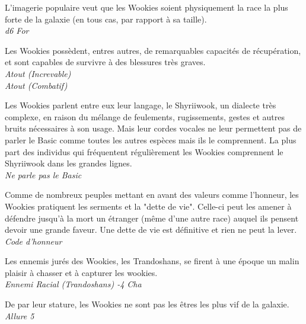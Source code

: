 \begin{description}[align=left]
	\item [Force de la nature] 				%
		L’imagerie populaire veut que les Wookies soient physiquement la race la plus forte de la galaxie (en tous cas, par rapport à sa taille).\\
		\emph{d6 For}

	\item [Increvable] 						%
		Les Wookies possèdent, entres autres, de remarquables capacités de récupération, et sont capables de survivre à des blessures très graves.\\
		\emph{Atout (Increvable)}\\
		\emph{Atout (Combatif)}

	\item [Shyriiwook] 						%
		Les Wookies parlent entre eux leur langage, le Shyriiwook, un dialecte très complexe, en raison du mélange de feulements, rugissements, gestes et autres bruits nécessaires à son usage. Mais leur cordes vocales ne leur permettent pas de parler le Basic comme toutes les autres espèces mais ils le comprennent. La plus part des individus qui fréquentent régulièrement les Wookies comprennent le Shyriiwook dans les grandes lignes.\\
		\emph{Ne parle pas le Basic}

	\item [Force \& Honneur] 				%
		Comme de nombreux peuples mettant en avant des valeurs comme l’honneur, les Wookies pratiquent les serments et la "dette de vie". Celle-ci peut les amener à défendre jusqu’à la mort un étranger (même d’une autre race) auquel ils pensent devoir une grande faveur. Une dette de vie est définitive et rien ne peut la lever.\\
		\emph{Code d’honneur}

	\item [Ennemis jurés] 					%
		Les ennemis jurés des Wookies, les Trandoshans, se firent à une époque un malin plaisir à chasser et à capturer les wookies.\\
		\emph{Ennemi Racial (Trandoshans) -4 Cha}

	\item [Il faut partir à point] 			%
		De par leur stature, les Wookies ne sont pas les êtres les plus vif de la galaxie.\\
		\emph{Allure 5}
\end{description}